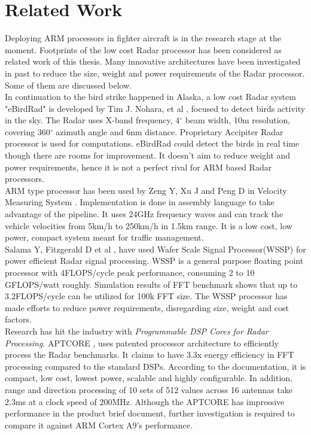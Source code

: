\section{Related Work}
\label{sec:related_work}
Deploying ARM processors in fighter aircraft is in the research stage at the moment. Footprints of the low cost Radar processor has been considered as related work of this thesis. Many innovative architectures have been investigated in past to reduce the size, weight and power requirements of the Radar processor. Some of them are discussed below. \\[0.4cm]
In continuation to the bird strike happened in Alaska, a low cost Radar system "eBirdRad" is developed by Tim J. Nohara, et al \cite{relWork1}, focused to detect birds activity in the sky. The Radar uses X-band frequency, 4$^{\circ}$ beam width, 10m resolution, covering 360$^{\circ}$  azimuth angle and 6nm distance. Proprietary Accipiter Radar processor is used for computations. eBirdRad could detect the birds in real time though there are rooms for improvement. It doesn't aim to reduce weight and power requirements, hence it is not a perfect rival for ARM based Radar processors. \\[0.4cm]
ARM type processor has been used by Zeng Y, Xu J and Peng D in Velocity Measuring System \cite{relWork2}. Implementation is done in assembly language to take advantage of the pipeline. It uses 24GHz frequency waves and can track the vehicle velocities from 5km/h to 250km/h in 1.5km range. It is a low cost, low power, compact system meant for traffic management. \\[0.4cm]
Salama Y, Fitzgerald D et al \cite{relWork3}, have used Wafer Scale Signal Processor(WSSP) for power efficient Radar signal processing. WSSP is a general purpose floating point processor with 4FLOPS/cycle peak performance, consuming 2 to 10 GFLOPS/watt roughly. Simulation results of FFT benchmark shows that up to 3.2FLOPS/cycle can be utilized for 100k FFT size. The WSSP processor has made efforts to reduce power requirements, disregarding size, weight and cost factors.\\[0.4cm]
Research has hit the industry with \textsl{Programmable DSP Cores for Radar Processing}. APTCORE \cite{relWork4}, uses patented processor architecture to efficiently process the Radar benchmarks. It claims to have 3.3x energy efficiency in FFT processing compared to the standard DSPs. According to the documentation, it is compact, low cost, lowest power, scalable and highly configurable. In addition, range and direction processing of 10 sets of 512 values across 16 antennas take 2.3ms at a clock speed of 200MHz. Although the APTCORE has impressive performance in the product brief document, further investigation is required to compare it against ARM Cortex A9's performance.
